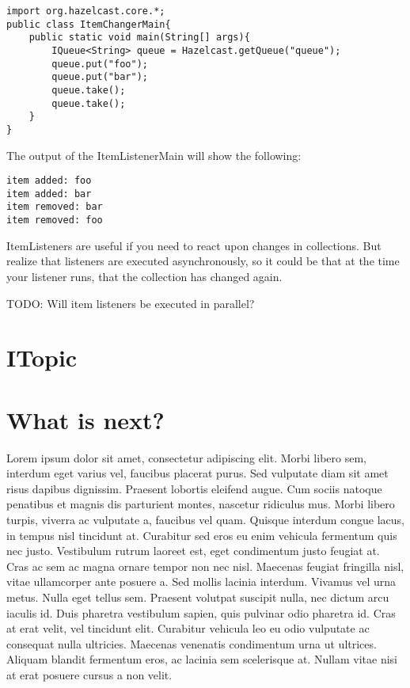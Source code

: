 \begin{verbatim}
import org.hazelcast.core.*;	
public class ItemChangerMain{
    public static void main(String[] args){
        IQueue<String> queue = Hazelcast.getQueue("queue");
        queue.put("foo");
        queue.put("bar");
        queue.take();
        queue.take();
    }
}
\end{verbatim}

The output of the ItemListenerMain will show the following:
\begin{verbatim}
item added: foo
item added: bar
item removed: bar
item removed: foo
\end{verbatim}

ItemListeners are useful if you need to react upon changes in collections. But realize that listeners 
are executed asynchronously, so it could be that at the time your listener runs, that the collection 
has changed again.

TODO: Will item listeners be executed in parallel?

\section{ITopic}

\section{What is next?}
Lorem ipsum dolor sit amet, consectetur adipiscing elit. Morbi libero sem,
interdum eget varius vel, faucibus placerat purus. Sed vulputate diam sit amet
risus dapibus dignissim. Praesent lobortis eleifend augue. Cum sociis natoque
penatibus et magnis dis parturient montes, nascetur ridiculus mus. Morbi libero
turpis, viverra ac vulputate a, faucibus vel quam. Quisque interdum congue
lacus, in tempus nisl tincidunt at. Curabitur sed eros eu enim vehicula
fermentum quis nec justo. Vestibulum rutrum laoreet est, eget condimentum justo
feugiat at. Cras ac sem ac magna ornare tempor non nec nisl. Maecenas feugiat
fringilla nisl, vitae ullamcorper ante posuere a. Sed mollis lacinia interdum.
Vivamus vel urna metus. Nulla eget tellus sem. Praesent volutpat suscipit nulla,
nec dictum arcu iaculis id. Duis pharetra vestibulum sapien, quis pulvinar odio
pharetra id. Cras at erat velit, vel tincidunt elit. Curabitur vehicula leo eu
odio vulputate ac consequat nulla ultricies. Maecenas venenatis condimentum
urna ut ultrices. Aliquam blandit fermentum eros, ac lacinia sem scelerisque
at. Nullam vitae nisi at erat posuere cursus a non velit.
